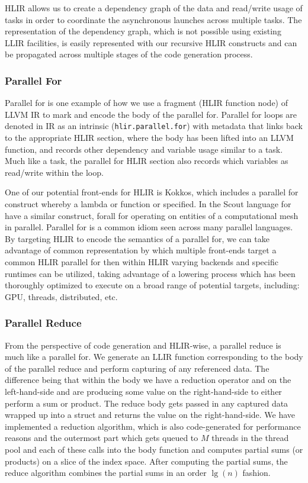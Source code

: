 \documentclass[12pt]{article}
\begin{document}
HLIR allows us to create a dependency graph of the data and read/write usage of tasks in order to coordinate the asynchronous launches across multiple tasks. The representation of the dependency graph, which is not possible using existing LLIR facilities, is easily represented with our recursive HLIR constructs and can be propagated across multiple stages of the code generation process.

\subsubsection{Parallel For}

Parallel for is one example of how we use a fragment (HLIR function node) of LLVM IR to mark and encode the body of the parallel for. Parallel for loops are denoted in IR as an intrinsic ({\tt hlir.parallel.for}) with metadata that links back to the appropriate HLIR section, where the body has been lifted into an LLVM function, and records other dependency and variable usage similar to a task. Much like a task, the parallel for HLIR section also records which variables as read/write within the loop.

One of our potential front-ends for HLIR is Kokkos, which includes a parallel for construct whereby a lambda or function or specified. In the Scout language for have a similar construct, forall for operating on entities of a computational mesh in parallel. Parallel for is a common idiom seen across many parallel languages. By targeting HLIR to encode the semantics of a parallel for, we can take advantage of common representation by which multiple front-ends target a common HLIR parallel for then within HLIR varying backends and specific runtimes can be utilized, taking advantage of a lowering process which has been thoroughly optimized to execute on a broad range of potential targets, including: GPU, threads, distributed, etc.

\subsubsection{Parallel Reduce}

From the perspective of code generation and HLIR-wise, a parallel reduce is much like a parallel for. We generate an LLIR function corresponding to the body of the parallel reduce and perform capturing of any referenced data. The difference being that within the body we have a reduction operator and on the left-hand-side and are producing some value on the right-hand-side to either perform a sum or product. The reduce body gets passed in any captured data wrapped up into a struct and returns the value on the right-hand-side. We have implemented a reduction algorithm, which is also code-generated for performance reasons and the outermost part which gets queued to $M$ threads in the thread pool and each of these calls into the body function and computes partial sums (or products) on a slice of the index space. After computing the partial sums, the reduce algorithm combines the partial sums in an order $\lg(n)$ fashion.
\end{document}
